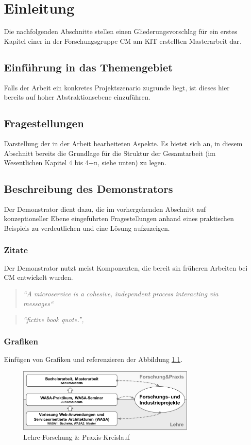 \chapter{Einleitung}
\label{cha:einleitung}
Die nachfolgenden Abschnitte stellen einen Gliederungsvorschlag für ein erstes Kapitel einer in der Forschungsgruppe \gls{CM} am \gls{KIT} erstellten Masterarbeit dar. 

\section{Einführung in das Themengebiet}
Falls der Arbeit ein konkretes Projektszenario zugrunde liegt, ist dieses hier bereits auf hoher Abstraktionsebene einzuführen.

\section{Fragestellungen}
Darstellung der in der Arbeit bearbeiteten Aspekte. Es bietet sich an, in diesem Abschnitt bereits die Grundlage für die Struktur der Gesamtarbeit (im Wesentlichen Kapitel 4 bis 4+n, siehe unten) zu legen.

\section{Beschreibung des Demonstrators}
Der Demonstrator dient dazu, die im vorhergehenden Abschnitt auf konzeptioneller Ebene eingeführten Fragestellungen anhand eines praktischen Beispiels zu verdeutlichen und eine Lösung aufzuzeigen.

\subsection{Zitate}
\label{subsec:zitate}
Der Demonstrator nutzt meist Komponenten, die bereit sin früheren Arbeiten bei \gls{CM} entwickelt wurden.
\begin{quote}
\textit{``A microservice is a cohesive, independent process interacting via messages``}
\end{quote}
\begin{quote}
\textit{``fictive book quote.'', \cite[S.~99]{Be02}}
\end{quote}

\subsection{Grafiken}
Einfügen von Grafiken und referenzieren der Abbildung \ref{fig:lehre}.
\begin{figure}[h]
	\centering
	\includegraphics[width=0.8\textwidth]{images/lehre_kreislauf.png}
	\caption{Lehre-Forschung \& Praxis-Kreislauf}
	\label{fig:lehre}
\end{figure}

